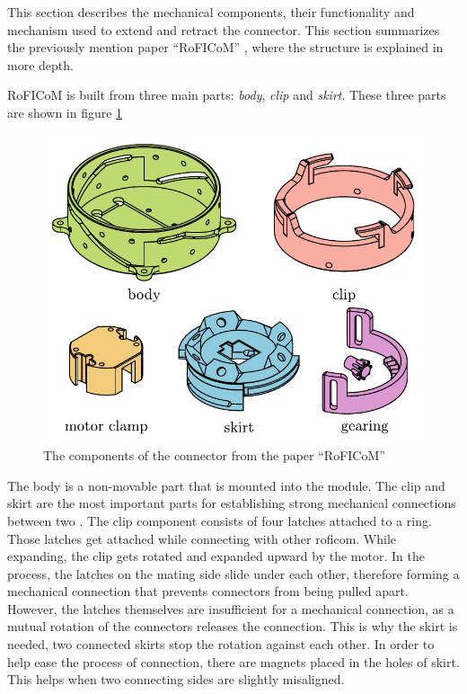 \documentclass[
  digital,     %
  oneside,     %
  nosansbold,  %
  nocolorbold, %
  lof,         %
  lot,         %
]{fithesis4}
\begin{document}
This section describes the mechanical components, their functionality and mechanism used to extend and retract the connector. This section summarizes the previously mention paper ``RoFICoM'' \cite{MrazekBarnat2019Roficom}, where the structure is explained in more depth.

RoFICoM is built from three main parts: \emph{body}, \emph{clip} and \emph{skirt}. These three parts are shown in figure \ref{ fig:key-components }

\begin{figure}[ht]
    \includegraphics{ dock_components.pdf }
    \caption{ The components of the connector from the paper ``RoFICoM'' \cite{MrazekBarnat2019Roficom} }
    \label{ fig:key-components }
\end{figure}

The body is a non-movable part that is mounted into the module.
The clip and skirt are the most important parts for establishing strong mechanical connections between two .
The clip component consists of four latches attached to a ring. Those latches get attached while connecting with
other \acrshort{roficom}. While expanding, the clip gets rotated and expanded upward by the motor. In the process, the latches on the mating
side slide under each other, therefore forming a mechanical connection that prevents connectors from being pulled apart.
However, the latches themselves are insufficient for a mechanical connection, as a mutual rotation of the connectors releases
the connection. This is why the skirt is needed, two connected skirts stop the rotation against each other. In order to help ease the process of connection, there are magnets placed in the holes of skirt. This helps when two connecting sides are slightly misaligned.
\end{document}
